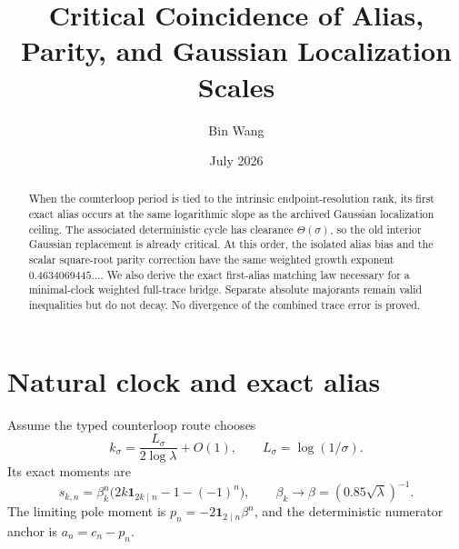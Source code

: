 \documentclass[11pt]{article}
\title{Critical Coincidence of Alias, Parity, and Gaussian Localization Scales}
\author{Bin Wang}\date{July 2026}
\theoremstyle{remark}\newtheorem{remark}[theorem]{Remark}
\begin{document}
\maketitle
\begin{abstract}
When the counterloop period is tied to the intrinsic endpoint-resolution
rank, its first exact alias occurs at the same logarithmic slope as the
archived Gaussian localization ceiling.  The associated deterministic cycle
has clearance $\Theta(\sigma)$, so the old interior Gaussian replacement is
already critical.  At this order, the isolated alias bias and the scalar
square-root parity correction have the same weighted growth exponent
$0.4634069445\ldots$.  We also derive the exact first-alias matching law
necessary for a minimal-clock weighted full-trace bridge.  Separate absolute
majorants remain valid inequalities but do not decay.  No divergence of the
combined trace error is proved.
\end{abstract}

\section{Natural clock and exact alias}
Assume the typed counterloop route chooses
\[
 k_\sigma=\frac{L_\sigma}{2\log\lambda}+O(1),\qquad
 L_\sigma=\log(1/\sigma).
\]
Its exact moments are
\[
 s_{k,n}=\beta_k^n
 \bigl(2k\mathbf1_{2k\mid n}-1-(-1)^n\bigr),
 \qquad
 \beta_k\to\beta=(0.85\sqrt\lambda)^{-1}.
\]
The limiting pole moment is
$p_n=-2\mathbf1_{2\mid n}\beta^n$, and the deterministic numerator anchor
is $a_n=c_n-p_n$.
\end{document}
